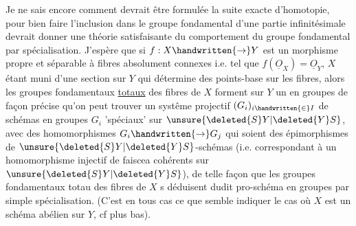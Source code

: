 Je ne sais encore comment devrait être formulée la suite exacte d'homotopie, pour bien faire l'inclusion dans le groupe fondamental d'une partie infinitésimale devrait donner une théorie satisfaisante du comportement du groupe fondamental par spécialisation. J'espère que si $f:X\handwritten{\to}Y$ est un morphisme propre et séparable à fibres absolument connexes i.e. tel que $f(\underline{O}_X)=\underline{O}_Y$, $X$ étant muni   d'une section  sur $Y$ qui détermine des points-base sur les fibres, alors les groupes fondamentaux \uline{totaux} des fibres de $X$ forment sur $Y$ un  en groupes  de façon précise qu'on peut trouver un systême projectif  $(G_i)_{i\handwritten{\in}I}$ de schémas en groupes $G_i$ 'spéciaux' sur $\unsure{\deleted{S}Y|\deleted{Y}S}$, avec des homomorphismes $G_i\handwritten{\to}G_j$ qui soient des épimorphismes de $\unsure{\deleted{S}Y|\deleted{Y}S}$-schémas (i.e. correspondant à un homomorphisme injectif de faiscea cohérents sur $\unsure{\deleted{S}Y|\deleted{Y}S}$), de telle façon que les groupes fondamentaux totau des fibres de $X$ s déduisent dudit pro-schéma en groupes par simple spécialisation. (C'est en tous cas ce que semble indiquer le cas où $X$ est un schéma abélien sur $Y$, cf plus bas).
